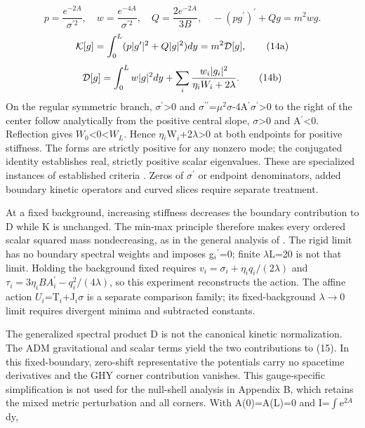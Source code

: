 \documentclass[11pt,a4paper]{article}
\begin{document}
\begin{equation}
p=\frac{e^{-2A}}{\sigma^{\prime2}},\quad w=\frac{e^{-4A}}{\sigma^{\prime2}},\quad Q=\frac{2e^{-2A}}{3B},\quad -(pg^\prime)^\prime+Qg=m^2wg.\tag{13}
\end{equation}
\begin{equation}
{\cal K}[g]=\int_0^L(p|g^\prime|^2+Q|g|^2)dy=m^2{\cal D}[g],\tag{14a}
\end{equation}
\begin{equation}
{\cal D}[g]=\int_0^Lw|g|^2dy+\sum_i\frac{w_i|g_i|^2}{\eta_iW_i+2\lambda}.\tag{14b}
\end{equation}
On the regular symmetric branch, \ensuremath{\sigma}\ensuremath{{}^{\prime}}>0 and \ensuremath{\sigma}\ensuremath{{}^{\prime\prime}}=\ensuremath{\mu}\ensuremath{{}^{2}}\ensuremath{\sigma}-4A\ensuremath{{}^{\prime}}\ensuremath{\sigma}\ensuremath{{}^{\prime}}>0 to the right of the center follow analytically from the positive central slope, \ensuremath{\sigma}>0 and A\ensuremath{{}^{\prime}}<0. Reflection gives \ensuremath{W_0}<0<\ensuremath{W_L}. Hence \ensuremath{\eta}\ensuremath{{}_{i}}W\ensuremath{{}_{i}}+2\ensuremath{\lambda}>0 at both endpoints for positive stiffness. The forms are strictly positive for any nonzero mode; the conjugated identity establishes real, strictly positive scalar eigenvalues. These are specialized instances of established criteria \cite{ref5,ref6,ref23}. Zeros of \ensuremath{\sigma}\ensuremath{{}^{\prime}} or endpoint denominators, added boundary kinetic operators and curved slices require separate treatment.

At a fixed background, increasing stiffness decreases the boundary contribution to D while K is unchanged. The min-max principle therefore makes every ordered scalar squared mass nondecreasing, as in the general analysis of \cite{ref6}. The rigid limit has no boundary spectral weights and imposes g\ensuremath{{}_{i}}\ensuremath{{}^{\prime}}=0; finite \ensuremath{\lambda}L=20 is not that limit. Holding the background fixed requires \ensuremath{v_i=\sigma_i+\eta_iq_i/(2\lambda)} and \ensuremath{\tau_i=3\eta_iBA_i^{\prime}-q_i^2/(4\lambda)}, so this experiment reconstructs the action. The affine action \ensuremath{U_i}=T\ensuremath{{}_{i}}+J\ensuremath{{}_{i}}\ensuremath{\sigma} is a separate comparison family; its fixed-background \ensuremath{\lambda}\ensuremath{\to}0 limit requires divergent minima and subtracted constants.

The generalized spectral product D is not the canonical kinetic normalization. The ADM gravitational and scalar terms yield the two contributions to (15). In this fixed-boundary, zero-shift representative the potentials carry no spacetime derivatives and the GHY corner contribution vanishes. This gauge-specific simplification is not used for the null-shell analysis in Appendix B, which retains the mixed metric perturbation and all corners. With A(0)=A(L)=0 and I=\ensuremath{\int}e\ensuremath{{}^{2A}}dy,
\end{document}
